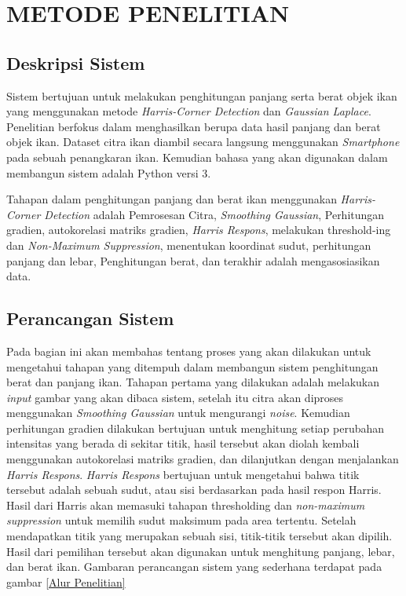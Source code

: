 
\chapter{METODE PENELITIAN}

\section{Deskripsi Sistem}
    Sistem bertujuan untuk melakukan penghitungan panjang serta berat objek ikan yang menggunakan
metode \emph{Harris-Corner Detection} dan \emph{Gaussian Laplace}. Penelitian berfokus dalam menghasilkan berupa
data hasil panjang dan berat objek ikan. Dataset citra ikan diambil secara langsung menggunakan \emph{Smartphone} pada sebuah
penangkaran ikan. Kemudian bahasa yang akan digunakan dalam membangun sistem adalah Python versi 3.

Tahapan dalam penghitungan panjang dan berat ikan menggunakan \emph{Harris-Corner Detection} adalah Pemrosesan Citra,
\emph{Smoothing Gaussian}, Perhitungan gradien, autokorelasi matriks gradien, \emph{Harris Respons}, melakukan threshold-ing dan \emph{Non-Maximum Suppression}, menentukan koordinat sudut, perhitungan panjang dan lebar, Penghitungan berat,
dan terakhir adalah mengasosiasikan data.

\section{Perancangan Sistem}
    Pada bagian ini akan membahas tentang proses yang akan dilakukan untuk mengetahui tahapan yang ditempuh
dalam membangun sistem penghitungan berat dan panjang ikan. Tahapan pertama yang dilakukan adalah melakukan \emph{input} gambar
yang akan dibaca sistem, setelah itu citra akan diproses menggunakan \emph{Smoothing Gaussian} untuk mengurangi \emph{noise}. Kemudian perhitungan gradien dilakukan bertujuan untuk menghitung setiap perubahan intensitas yang berada di sekitar titik,
hasil tersebut akan diolah kembali menggunakan autokorelasi matriks gradien, dan dilanjutkan dengan menjalankan \emph{Harris Respons}. \emph{Harris Respons} bertujuan untuk mengetahui bahwa titik tersebut adalah sebuah sudut, atau sisi berdasarkan pada hasil respon Harris.
Hasil dari Harris akan memasuki tahapan thresholding dan \emph{non-maximum suppression} untuk memilih sudut maksimum pada area tertentu. Setelah mendapatkan titik yang merupakan sebuah sisi, titik-titik tersebut akan dipilih.
Hasil dari pemilihan tersebut akan digunakan untuk menghitung panjang, lebar, dan berat ikan. Gambaran perancangan sistem yang sederhana terdapat pada gambar \ref*{Alur Penelitian}

